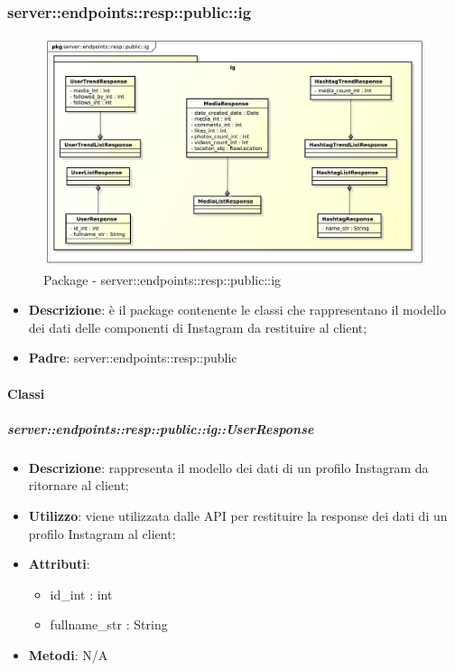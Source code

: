 \subsubsection{server::endpoints::resp::public::ig} %
\label{ssub:bdsm_app_server_endpoints_resp_public_ig}
\begin{figure}[!htbp]
	\centering
	\centerline{\includegraphics[scale=0.5]{./images/server/resp_ig.pdf}}
	\caption{Package - server::endpoints::resp::public::ig}
\end{figure}

\begin{itemize}
  \item \textbf{Descrizione}: è il package contenente le classi che rappresentano il modello dei dati delle componenti di Instagram da restituire al client;
  \item \textbf{Padre}: server::endpoints::resp::public
\end{itemize}

	\paragraph{Classi} %

    \subparagraph{server::endpoints::resp::public::ig::UserResponse} %
    \label{subp:bdsm_app_server_endpoints_resp_public_ig_userresponse}
    \begin{itemize}
      \item \textbf{Descrizione}: rappresenta il modello dei dati di un profilo Instagram da ritornare al client;
      \item \textbf{Utilizzo}: viene utilizzata dalle API per restituire la response dei dati di un profilo Instagram al client;
      
	  \item \textbf{Attributi}: 
	  	\begin{itemize}
	  		\item id\_int : int
	  		\item fullname\_str : String
	  	\end{itemize}
	  \item \textbf{Metodi}: N/A
      \end{itemize}

